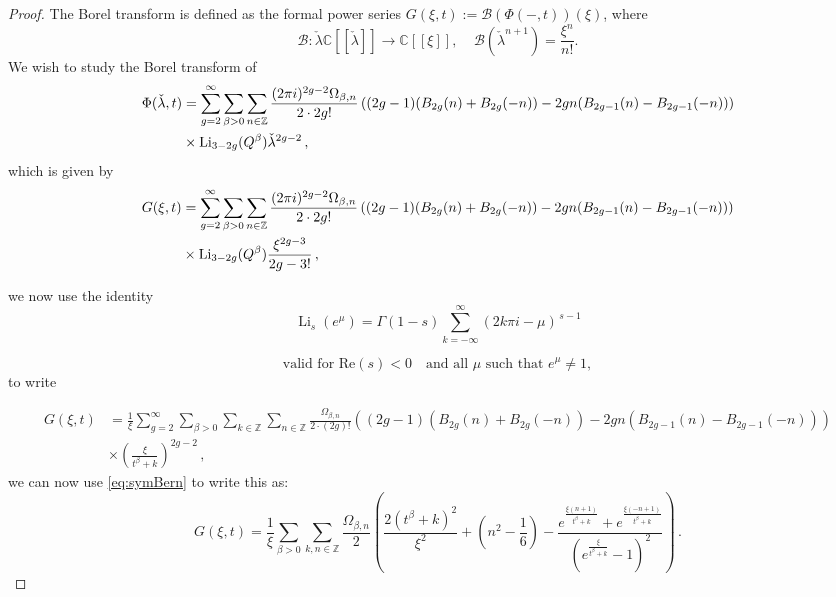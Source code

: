 \documentclass[10pt,a4paper]{amsart}
\newcommand{\ii}{\textnormal{i}}
\begin{document}
\begin{proof}

The Borel transform is defined as the formal power series $G(\xi,t):=\mathcal{B}(\Phi(-,t))(\xi)$, where
\begin{equation}
    \mathcal{B}\colon\check{\lambda}\mathbb{C}[[\check{\lambda}]]\to \mathbb{C}[[\xi]], \;\;\;\; \mathcal{B}(\check{\lambda}^{n+1})=\frac{\xi^n}{n!}.
\end{equation}
We wish to study the Borel transform of 
\begin{align}
\Phi(\check{\lambda},t)& = \sum_{g=2}^{\infty}\sum_{\beta>0} \sum_{n\in\mathbb{Z}}\frac{(2\pi \ii)^{2g-2} \Omega_{\beta,n}}{2\cdot2g!} \left( (2g-1) (B_{2g}(n)+B_{2g}(-n))- 2g n (B_{2g-1}(n)-B_{2g-1}(-n))\right)\nonumber \\
&\times  \operatorname{Li}_{3-2g}(Q^{\beta}) \check{\lambda}^{2g-2}\,,
\end{align}
which is given by
\begin{align}
G(\xi,t)& = \sum_{g=2}^{\infty}\sum_{\beta>0} \sum_{n\in\mathbb{Z}}\frac{(2\pi \ii)^{2g-2} \Omega_{\beta,n}}{2\cdot2g!} \left( (2g-1) (B_{2g}(n)+B_{2g}(-n))- 2g n (B_{2g-1}(n)-B_{2g-1}(-n))\right)\nonumber \\
&\times  \operatorname{Li}_{3-2g}(Q^{\beta}) \frac{\xi^{2g-3}}{2g-3!}\,,
\end{align}

we now use the identity
$$
\operatorname{Li}_s \left(e^{\mu}\right)
=
\Gamma(1 - s)
\sum_{k=-\infty}^{\infty}
\left(2k\pi i - \mu\right)^{\,s - 1}
$$

$$
\text{valid for } \textrm{Re}(s) < 0 \quad \text{and all } \mu \text{ such that } e^{\mu} \neq 1,
$$
to write

\begin{align}
G(\xi,t)& = \frac{1}{\xi} \sum_{g=2}^{\infty}\sum_{\beta>0} \sum_{k\in \mathbb{Z}}\sum_{n\in\mathbb{Z}} \frac{\Omega_{\beta,n}}{2\cdot (2g)!} \left( (2g-1) (B_{2g}(n)+B_{2g}(-n))- 2g n (B_{2g-1}(n)-B_{2g-1}(-n))\right)\nonumber \\
& \times \left(\frac{\xi}{t^{\beta}+k}\right)^{2g-2}\,,
\end{align}
we can now use \eqref{eq:symBern} to write this as:
\begin{equation}
G(\xi,t)= \frac{1}{\xi} \sum_{\beta>0} \sum_{k,n\in \mathbb{Z}} \frac{\Omega_{\beta, n}}{2}
\left(
  \frac{2(t^{\beta}+k)^2}{\xi^2}
  + \left(n^2 - \frac{1}{6}\right)
  - \frac{
      e^{\frac{\xi(n+1)}{t^{\beta}+k}}
      + e^{\frac{\xi(-n+1)}{t^{\beta}+k}}
    }{
       \left( e^{\frac{\xi}{t^{\beta}+k}} - 1 \right)^2
    } 
\right)\,.
\end{equation}
\end{proof}
\end{document}
